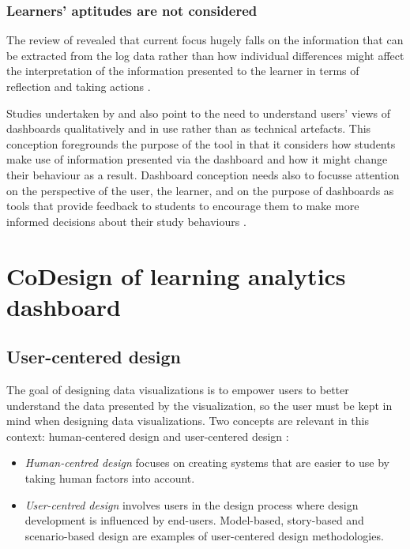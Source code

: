 \documentclass[preprint,12pt]{elsarticle}
\begin{document}
\subsubsection{Learners' aptitudes are not considered}
The review of \citet{Schwendimann2017} revealed that current focus hugely falls on the information that can be extracted from the log data rather than how individual differences might affect the interpretation of the information presented to the learner in terms of reflection and taking actions \citep{Gavsevic2015}. 

Studies undertaken by \citet*{bodily2017trends}  and \citet*{viberg2018current}  also point to  the need to understand users' views of dashboards qualitatively and in use rather than  as technical artefacts. This conception foregrounds the purpose of the tool in that it considers how  students make use of information presented via the dashboard and how it might change their  behaviour as a result. Dashboard conception needs also to focusse attention on the perspective of  the user, the learner, and on the purpose of dashboards as tools that provide feedback to students  to encourage them to make more informed decisions about their study behaviours \citet*{howell2018learning,bennett2019four}.


\section{CoDesign of learning analytics dashboard}
\subsection{User-centered design}
The goal of designing data visualizations is to empower users to better understand the data presented by the visualization, so the user must be kept in mind when designing data visualizations. Two concepts are relevant in this context: human-centered design and user-centered design :
\begin{itemize}
    \item \textit{Human-centred design} focuses on creating systems that are easier to use by taking human factors into account.
    \item \textit{User-centred design} involves users in the design process where design development is influenced by end-users. Model-based, story-based and scenario-based design are examples of user-centered design methodologies. 
\end{itemize}
\end{document}
